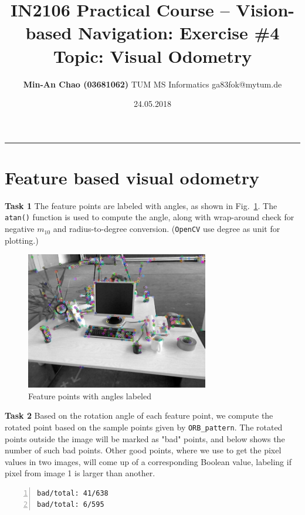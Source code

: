 \documentclass[12pt,a4paper]{article}
\makeatletter
\newcommand{\docTitle}{IN2106 Practical Course -- Vision-based Navigation: Exercise \#4}
\newcommand{\docSubtitle}{Topic: Visual Odometry}
\newcommand{\docAuthor}{Min-An Chao (03681062)}
\newcommand{\docAuthorDept}{TUM MS Informatics}
\newcommand{\docAuthorEmail}{ga83fok@mytum.de}
\newcommand{\docDate}{24.05.2018}
\makeatother
\begin{document}
    \title{\vspace{-1.75cm} \large \textsf{\textbf{\docTitle}}\\ \textsf{\docSubtitle}}
    \author{\normalsize \textsf{
        \textbf{\docAuthor} \hspace{6pt}\textbar\hspace{6pt}
        \docAuthorDept \hspace{6pt}\textbar\hspace{6pt}
        \docAuthorEmail}}
    \date{\small \textsf{\docDate}}
    \maketitle 
    \thispagestyle{fancy}
    \vspace{-0.5cm}
    \hrule
    
    \section{Feature based visual odometry}
    \textsf{\textbf{Task 1}}
    The feature points are labeled with angles,
    as shown in Fig.~\ref{fig:feat1}.
    The \texttt{atan()} function is used
    to compute the angle,
    along with wrap-around check for negative $m_{10}$
    and radius-to-degree conversion.
    (\texttt{OpenCV} use degree as unit for plotting.)
    
    \begin{figure}[!h]
        \centering
        \includegraphics[height=6cm]{fig/feat1.png}
        \caption{Feature points with angles labeled}
        \label{fig:feat1}
    \end{figure}
    
    \textsf{\textbf{Task 2}}
    Based on the rotation angle of each feature point,
    we compute the rotated point based on the sample points
    given by \texttt{ORB\_pattern}.
    The rotated points outside the image will be marked as 
    "bad" points, and below shows the number of such
    bad points.
    Other good points, 
    where we use to get the pixel values in two images,
    will come up of a corresponding Boolean value,
    labeling if pixel from image 1 is larger than another.
    \begin{lstlisting}[frame=single,numbers=left]
bad/total: 41/638
bad/total: 6/595
    \end{lstlisting}
    
\end{document}
